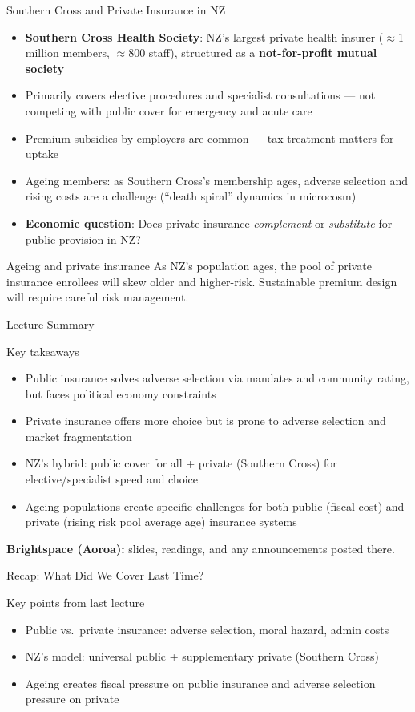 \documentclass[aspectratio=169, 12pt]{beamer}
\newcommand{\recapslide}[1]{%
  \begin{frame}{Recap: What Did We Cover Last Time?}
    \begin{block}{Key points from last lecture}
      \begin{itemize}#1\end{itemize}
    \end{block}
  \end{frame}}
\newcommand{\summaryside}[1]{%
  \begin{frame}{Lecture Summary}
    \begin{exampleblock}{Key takeaways}
      \begin{itemize}#1\end{itemize}
    \end{exampleblock}
    \vspace{0.5em}
    {\footnotesize\textcolor{OtagoGold}{\textbf{Brightspace (Aoroa):}} slides, readings, and any announcements posted there.}
  \end{frame}}
\begin{document}
\begin{frame}{Southern Cross and Private Insurance in NZ}
  \begin{itemize}
    \item \textbf{Southern Cross Health Society}: NZ's largest private health insurer
          ($\approx$1 million members, $\approx$800 staff), structured as a \textbf{not-for-profit
          mutual society}
    \item Primarily covers elective procedures and specialist consultations --- not competing
          with public cover for emergency and acute care
    \item Premium subsidies by employers are common --- tax treatment matters for uptake
    \item Ageing members: as Southern Cross's membership ages, adverse selection and rising
          costs are a challenge (``death spiral'' dynamics in microcosm)
    \item \textbf{Economic question}: Does private insurance \emph{complement} or
          \emph{substitute} for public provision in NZ?
  \end{itemize}
  \begin{alertblock}{Ageing and private insurance}
    As NZ's population ages, the pool of private insurance enrollees will skew older and
    higher-risk. Sustainable premium design will require careful risk management.
  \end{alertblock}
\end{frame}

\summaryside{
  \item Public insurance solves adverse selection via mandates and community rating, but faces political economy constraints
  \item Private insurance offers more choice but is prone to adverse selection and market fragmentation
  \item NZ's hybrid: public cover for all + private (Southern Cross) for elective/specialist speed and choice
  \item Ageing populations create specific challenges for both public (fiscal cost) and private (rising risk pool average age) insurance systems
}

\recapslide{
  \item Public vs.\ private insurance: adverse selection, moral hazard, admin costs
  \item NZ's model: universal public + supplementary private (Southern Cross)
  \item Ageing creates fiscal pressure on public insurance and adverse selection pressure on private
}
\end{document}
